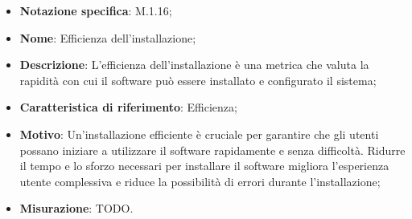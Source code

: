 \begin{itemize}
    \item \textbf{Notazione specifica}: M.1.16;
    \item \textbf{Nome}: Efficienza dell'installazione;
    \item \textbf{Descrizione}: L'efficienza dell'installazione è una metrica che valuta la rapidità con cui il software può essere installato e configurato il sistema;
    \item \textbf{Caratteristica di riferimento}: Efficienza;
    \item \textbf{Motivo}: Un'installazione efficiente è cruciale per garantire che gli utenti possano iniziare a utilizzare il software rapidamente e senza difficoltà. Ridurre il tempo e lo sforzo necessari per installare il software migliora l'esperienza utente complessiva e riduce la possibilità di errori durante l'installazione;
    \item \textbf{Misurazione}: TODO.
\end{itemize}
